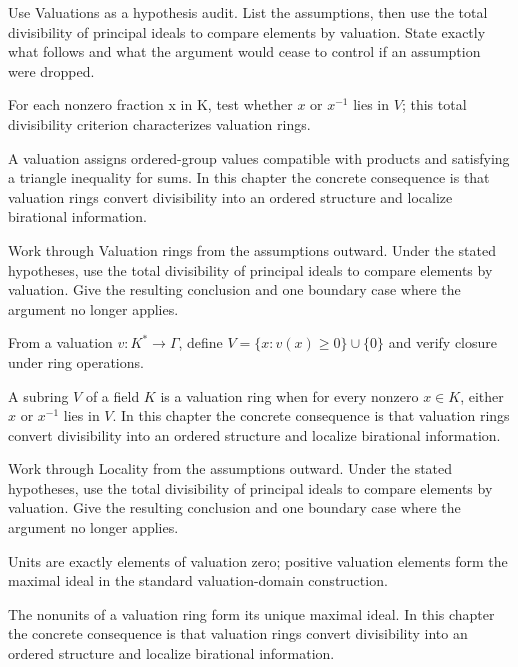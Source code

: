 \begin{exercise}\label{exr:v21-01}
Use Valuations as a hypothesis audit. List the assumptions, then use the total divisibility of principal ideals to compare elements by valuation. State exactly what follows and what the argument would cease to control if an assumption were dropped.
\end{exercise}
\begin{hint}
For each nonzero fraction x in K, test whether \(x\) or \(x^{-1}\) lies in \(V\); this total divisibility criterion characterizes valuation rings.
\end{hint}
\begin{solution}
A valuation assigns ordered-group values compatible with products and satisfying a triangle inequality for sums. In this chapter the concrete consequence is that valuation rings convert divisibility into an ordered structure and localize birational information.
\end{solution}

\begin{exercise}\label{exr:v21-02}
Work through Valuation rings from the assumptions outward. Under the stated hypotheses, use the total divisibility of principal ideals to compare elements by valuation. Give the resulting conclusion and one boundary case where the argument no longer applies.
\end{exercise}
\begin{hint}
From a valuation \(v:K^*\to\Gamma\), define \(V=\{x:v(x)\ge0\}\cup\{0\}\) and verify closure under ring operations.
\end{hint}
\begin{solution}
A subring $V$ of a field $K$ is a valuation ring when for every nonzero $x\in K$, either $x$ or $x^{-1}$ lies in $V$. In this chapter the concrete consequence is that valuation rings convert divisibility into an ordered structure and localize birational information.
\end{solution}

\begin{exercise}\label{exr:v21-03}
Work through Locality from the assumptions outward. Under the stated hypotheses, use the total divisibility of principal ideals to compare elements by valuation. Give the resulting conclusion and one boundary case where the argument no longer applies.
\end{exercise}
\begin{hint}
Units are exactly elements of valuation zero; positive valuation elements form the maximal ideal in the standard valuation-domain construction.
\end{hint}
\begin{solution}
The nonunits of a valuation ring form its unique maximal ideal. In this chapter the concrete consequence is that valuation rings convert divisibility into an ordered structure and localize birational information.
\end{solution}

